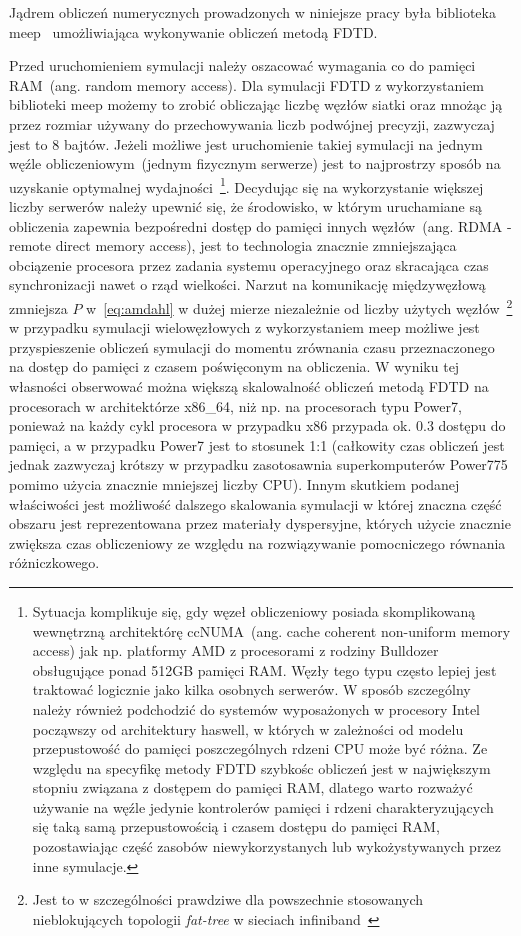 Jądrem obliczeń numerycznych prowadzonych w niniejsze pracy była biblioteka meep~\cite{OskooiRo10} umożliwiająca wykonywanie obliczeń metodą FDTD.

Przed uruchomieniem symulacji należy oszacować wymagania co do pamięci RAM~(ang. random memory access). Dla symulacji FDTD z wykorzystaniem biblioteki meep możemy to zrobić obliczając liczbę węzłów siatki oraz mnożąc ją przez rozmiar używany do przechowywania liczb podwójnej precyzji, zazwyczaj jest to 8 bajtów. Jeżeli możliwe jest uruchomienie takiej symulacji na jednym węźle obliczeniowym~(jednym fizycznym serwerze) jest to najprostrzy sposób na uzyskanie optymalnej wydajności~\footnote{Sytuacja komplikuje się, gdy węzeł obliczeniowy posiada skomplikowaną wewnętrzną architektórę ccNUMA~(ang. cache coherent non-uniform memory access) jak np. platformy AMD z procesorami z rodziny Bulldozer obsługujące ponad 512GB pamięci RAM. Węzły tego typu często lepiej jest traktować logicznie jako kilka osobnych serwerów. W sposób szczególny należy również podchodzić do systemów wyposażonych w procesory Intel począwszy od architektury haswell, w których w zależności od modelu przepustowość do pamięci poszczególnych rdzeni CPU może być różna. Ze względu na specyfikę metody FDTD szybkośc obliczeń jest w największym stopniu związana z dostępem do pamięci RAM, dlatego warto rozważyć używanie na węźle jedynie kontrolerów pamięci i rdzeni charakteryzujących się taką samą przepustowością i czasem dostępu do pamięci RAM, pozostawiając część zasobów niewykorzystanych lub wykożystywanych przez inne symulacje.}. Decydując się na wykorzystanie większej liczby serwerów należy upewnić się, że środowisko, w którym uruchamiane są obliczenia zapewnia bezpośredni dostęp do pamięci innych węzłów~(ang. RDMA - remote direct memory access), jest to technologia znacznie zmniejszająca obciązenie procesora przez zadania systemu operacyjnego oraz skracająca czas synchronizacji nawet o rząd wielkości. Narzut na komunikację międzywęzłową zmniejsza $P$ w~\ref{eq:amdahl} w dużej mierze niezależnie od liczby użytych węzłów~\footnote{Jest to w szczególności prawdziwe dla powszechnie stosowanych nieblokujących topologii \textit{fat-tree} w sieciach infiniband~\cite{zahavi2010optimized}} w przypadku symulacji wielowęzłowych z wykorzystaniem meep możliwe jest przyspieszenie obliczeń symulacji do momentu zrównania czasu przeznaczonego na dostęp do pamięci z czasem poświęconym na obliczenia. W wyniku tej własności obserwować można większą skalowalność obliczeń metodą FDTD na procesorach w architektórze x86\_64, niż np. na procesorach typu Power7, ponieważ na każdy cykl procesora w przypadku x86 przypada ok. 0.3 dostępu do pamięci, a w przypadku Power7 jest to stosunek 1:1 (całkowity czas obliczeń jest jednak zazwyczaj krótszy w przypadku zasotosawnia superkomputerów Power775 pomimo użycia znacznie mniejszej liczby CPU). Innym skutkiem podanej właściwości jest możliwość dalszego skalowania symulacji w której znaczna część obszaru jest reprezentowana przez materiały dyspersyjne, których użycie znacznie zwiększa czas obliczeniowy ze względu na rozwiązywanie pomocniczego równania różniczkowego.

